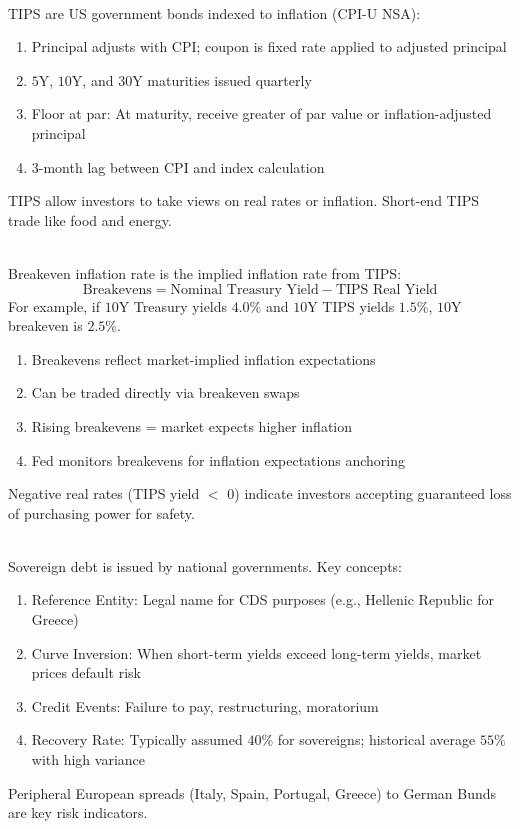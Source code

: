 \documentclass[a4paper,oneside,openany]{book}
\begin{document}
\begin{remark} \\
TIPS are US government bonds indexed to inflation (CPI-U NSA):
\begin{enumerate}[label=\roman*.]
\setlength{\itemsep}{0pt}
\item Principal adjusts with CPI; coupon is fixed rate applied to adjusted principal
\item $5$Y, $10$Y, and $30$Y maturities issued quarterly
\item Floor at par: At maturity, receive greater of par value or inflation-adjusted principal
\item $3$-month lag between CPI and index calculation
\end{enumerate}
TIPS allow investors to take views on real rates or inflation. Short-end TIPS trade like food and energy.
\end{remark}

\begin{remark} \\
Breakeven inflation rate is the implied inflation rate from TIPS:
\begin{equation*}
\text{Breakevens} = \text{Nominal Treasury Yield} - \text{TIPS Real Yield}
\end{equation*}
For example, if $10$Y Treasury yields $4.0\%$ and $10$Y TIPS yields $1.5\%$, $10$Y breakeven is $2.5\%$.
\begin{enumerate}[label=\roman*.]
\setlength{\itemsep}{0pt}
\item Breakevens reflect market-implied inflation expectations
\item Can be traded directly via breakeven swaps
\item Rising breakevens = market expects higher inflation
\item Fed monitors breakevens for inflation expectations anchoring
\end{enumerate}
Negative real rates (TIPS yield $<$ 0) indicate investors accepting guaranteed loss of purchasing power for safety.
\end{remark}

\begin{remark} \\
Sovereign debt is issued by national governments. Key concepts:
\begin{enumerate}[label=\roman*.]
\setlength{\itemsep}{0pt}
\item Reference Entity: Legal name for CDS purposes (e.g., Hellenic Republic for Greece)
\item Curve Inversion: When short-term yields exceed long-term yields, market prices default risk
\item Credit Events: Failure to pay, restructuring, moratorium
\item Recovery Rate: Typically assumed $40\%$ for sovereigns; historical average $55\%$ with high variance
\end{enumerate}
Peripheral European spreads (Italy, Spain, Portugal, Greece) to German Bunds are key risk indicators.
\end{remark}
\end{document}

